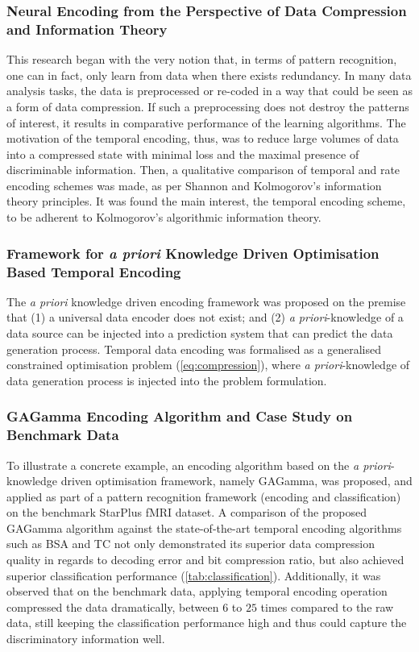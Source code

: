 \subsubsection{Neural Encoding from the Perspective of Data Compression and Information Theory} 

This research began with the very notion that, in terms of pattern recognition, one can in fact, only learn from data when there exists redundancy. In many data analysis tasks, the data is preprocessed or re-coded in a way that could be seen as a form of data compression. If such a preprocessing does not destroy the patterns of interest, it results in comparative performance of the learning algorithms. The motivation of the temporal encoding, thus, was to reduce large volumes of data into a compressed state with minimal loss and the maximal presence of discriminable information. Then, a qualitative comparison of temporal and rate encoding schemes was made, as per Shannon and Kolmogorov's information theory principles. It was found the main interest, the temporal encoding scheme, to be adherent to Kolmogorov's algorithmic information theory.
	
\subsubsection{Framework for \emph{a priori} Knowledge Driven Optimisation Based Temporal Encoding} 

The \emph{a priori} knowledge driven encoding framework was proposed on the premise that (1) a universal data encoder does not exist; and (2) \emph{a priori}-knowledge of a data source can be injected into a prediction system that can predict the data generation process. Temporal data encoding was formalised as a generalised constrained optimisation problem (\equationname \ref{eq:compression}), where \emph{a priori}-knowledge of data generation process is injected into the problem formulation.
	
\subsubsection{GAGamma Encoding Algorithm and Case Study on Benchmark Data} 

To illustrate a concrete example, an encoding algorithm based on the \emph{a priori}-knowledge driven optimisation framework, namely GAGamma, was proposed, and applied as part of a pattern recognition framework (encoding and classification) on the benchmark StarPlus fMRI dataset. A comparison of the proposed GAGamma algorithm against the state-of-the-art temporal encoding algorithms such as BSA and TC not only demonstrated its superior data compression quality in regards to decoding error and bit compression ratio, but also achieved superior classification performance (\tablename \ref{tab:classification}). Additionally, it was observed that on the benchmark data, applying temporal encoding operation compressed the data dramatically, between $6$ to $25$ times compared to the raw data, still keeping the classification performance high and thus could capture the discriminatory information well. 
   
